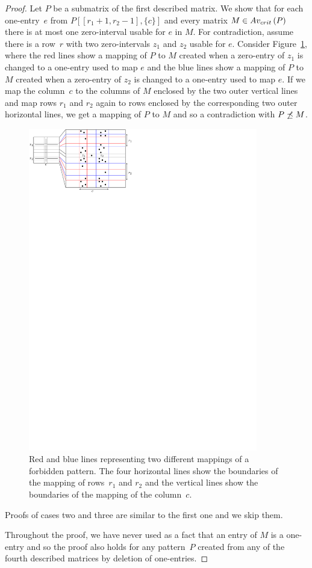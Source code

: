 \begin{proof}
Let $P$ be a submatrix of the first described matrix. We show that for each one-entry~$e$ from $P[[r_1+1,r_2-1],\{c\}]$ and every matrix $M\in Av_{crit}\left(P\right)$ there is at most one zero-interval usable for $e$ in $M$. For contradiction, assume there is a row~$r$ with two zero-intervals $z_1$ and $z_2$ usable for $e$. Consider Figure~\ref{fig:lemmaI1}, where the red lines show a mapping of $P$ to $M$ created when a zero-entry of $z_1$ is changed to a one-entry used to map $e$ and the blue lines show a mapping of $P$ to $M$ created when a zero-entry of $z_2$ is changed to a one-entry used to map $e$. If we map the column~$c$ to the columns of $M$ enclosed by the two outer vertical lines and map rows $r_1$ and $r_2$ again to rows enclosed by the corresponding two outer horizontal lines, we get a mapping of $P$ to $M$ and so a contradiction with $P\not\preceq M$.

\begin{figure}[!ht]
\centering
\includegraphics[width=100mm]{img/lemmaI1col.pdf}
\caption{Red and blue lines representing two different mappings of a forbidden pattern. The four horizontal lines show the boundaries of the mapping of rows~$r_1$ and $r_2$ and the vertical lines show the boundaries of the mapping of the column~$c$.}
\label{fig:lemmaI1}
\end{figure}
Proofs of cases two and three are similar to the first one and we skip them.

Throughout the proof, we have never used as a fact that an entry of $M$ is a one-entry and so the proof also holds for any pattern~$P$ created from any of the fourth described matrices by deletion of one-entries.
\end{proof}


